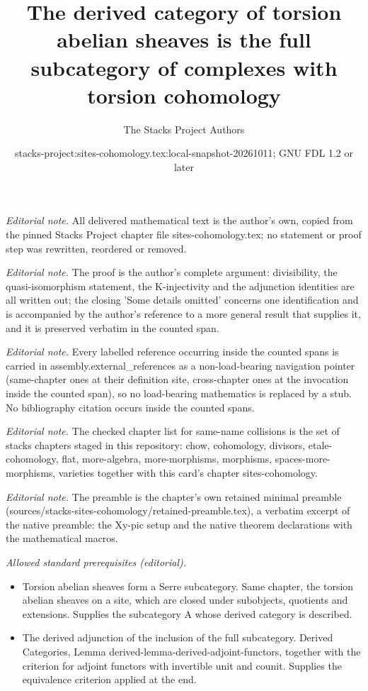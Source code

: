 \documentclass[10pt,a4paper]{amsart}
\title{The derived category of torsion abelian sheaves is the full subcategory of complexes with torsion cohomology}
\author{The Stacks Project Authors}
\date{stacks-project:sites-cohomology.tex:local-snapshot-20261011; GNU FDL 1.2 or later}
\theoremstyle{plain}
\theoremstyle{definition}
\theoremstyle{remark}
\numberwithin{equation}{subsection}
\begin{document}
\maketitle
\noindent\textit{Editorial note.} All delivered mathematical text is the author's own, copied from the pinned Stacks Project chapter file sites-cohomology.tex; no statement or proof step was rewritten, reordered or removed.\par\medskip
\noindent\textit{Editorial note.} The proof is the author's complete argument: divisibility, the quasi-isomorphism statement, the K-injectivity and the adjunction identities are all written out; the closing 'Some details omitted' concerns one identification and is accompanied by the author's reference to a more general result that supplies it, and it is preserved verbatim in the counted span.\par\medskip
\noindent\textit{Editorial note.} Every labelled reference occurring inside the counted spans is carried in assembly.external\_references as a non-load-bearing navigation pointer (same-chapter ones at their definition site, cross-chapter ones at the invocation inside the counted span), so no load-bearing mathematics is replaced by a stub. No bibliography citation occurs inside the counted spans.\par\medskip
\noindent\textit{Editorial note.} The checked chapter list for same-name collisions is the set of stacks chapters staged in this repository: chow, cohomology, divisors, etale-cohomology, flat, more-algebra, more-morphisms, morphisms, spaces-more-morphisms, varieties together with this card's chapter sites-cohomology.\par\medskip
\noindent\textit{Editorial note.} The preamble is the chapter's own retained minimal preamble (sources/stacks-sites-cohomology/retained-preamble.tex), a verbatim excerpt of the native preamble: the Xy-pic setup and the native theorem declarations with the mathematical macros.\par\medskip
\noindent\textit{Allowed standard prerequisites (editorial).}\begin{itemize}
\item Torsion abelian sheaves form a Serre subcategory. Same chapter, the torsion abelian sheaves on a site, which are closed under subobjects, quotients and extensions. Supplies the subcategory A whose derived category is described.
\item The derived adjunction of the inclusion of the full subcategory. Derived Categories, Lemma derived-lemma-derived-adjoint-functors, together with the criterion for adjoint functors with invertible unit and counit. Supplies the equivalence criterion applied at the end.
\end{itemize}\medskip
\end{document}
